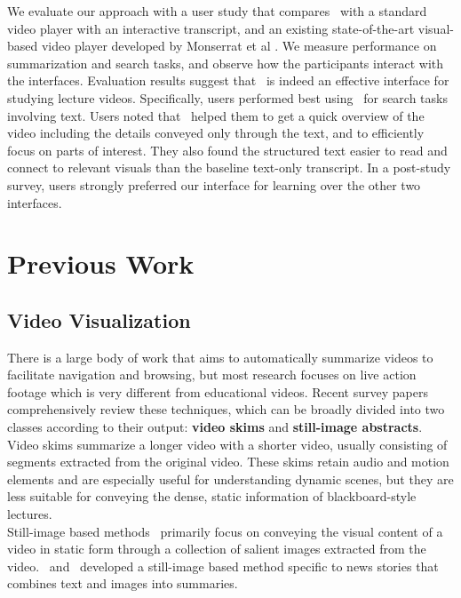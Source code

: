 We evaluate our approach with a user study that compares \systemname\ with a standard video player with an interactive transcript, and an existing state-of-the-art visual-based video player developed by Monserrat et al \cite{monserrat2013notevideo}. We measure performance on summarization and search tasks, and observe how the participants interact with the interfaces. Evaluation results suggest that \systemname\ is indeed an effective interface for studying lecture videos. Specifically, users performed best using \systemname\ for search tasks involving text. Users noted that \systemname\ helped them to get a quick overview of the video including the details conveyed only through the text, and to efficiently focus on parts of interest. They also found the structured text easier to read and connect to relevant visuals than the baseline text-only transcript. In a post-study survey, users strongly preferred our interface for learning over the other two interfaces.\\

\section{Previous Work}
%
\subsection{Video Visualization}
There is a large body of work that aims to automatically summarize videos to facilitate navigation and browsing, but most research focuses on live action footage which is very different from educational videos.  Recent survey papers \cite{truong2007video,borgo2011survey} comprehensively review these techniques, which can be broadly divided into two classes according to their output: \textbf{video skims} and \textbf{still-image abstracts}. \\

Video skims \cite{he1999auto,ekin2003automatic,ngo2005video,lu2013story} summarize a longer video with a shorter video, usually consisting of segments extracted from the original video. These skims retain audio and motion elements and are especially useful for understanding dynamic scenes, but they are less suitable for conveying the dense, static information of blackboard-style lectures. \\

Still-image based methods~\cite{uchihashi1999video,barnes2010video,hwang2006cinema,boreczky2000interactive}
primarily focus on conveying the visual content of a
video in static form through a collection of salient images extracted from the video.~\cite{christel2002collages} and~\cite{pickering2003anses} developed a still-image based method specific to news stories that combines text and images into summaries.\\


